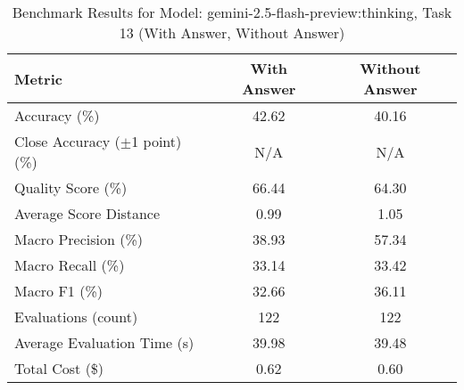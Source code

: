 \begin{table}[htbp]
\centering
\caption{Benchmark Results for Model: gemini-2.5-flash-preview:thinking, Task 13 (With Answer, Without Answer)}
\begin{tabular}{lcc}
\toprule
\textbf{Metric} & \textbf{With Answer} & \textbf{Without Answer} \\
\midrule
Accuracy (\%) & 42.62 & 40.16 \\
Close Accuracy ($\pm$1 point) (\%) & N/A & N/A \\
Quality Score (\%) & 66.44 & 64.30 \\
Average Score Distance & 0.99 & 1.05 \\
Macro Precision (\%) & 38.93 & 57.34 \\
Macro Recall (\%) & 33.14 & 33.42 \\
Macro F1 (\%) & 32.66 & 36.11 \\
Evaluations (count) & 122 & 122 \\
Average Evaluation Time (s) & 39.98 & 39.48 \\
Total Cost (\$) & 0.62 & 0.60 \\
\bottomrule
\end{tabular}
\end{table}